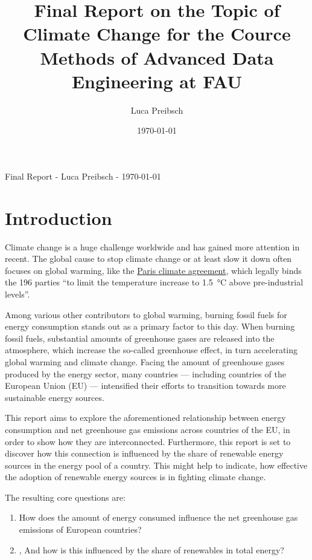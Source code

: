 \documentclass{article}
\begin{document}
\title{Final Report on the Topic of Climate Change
for the Cource Methods of Advanced Data Engineering at FAU}
\author{Luca Preibsch}
\date{\today}

\begin{center}
Final Report - Luca Preibsch - \today
\end{center}


\section*{Introduction}
Climate change is a huge challenge worldwide and has gained more attention in recent.
The global cause to stop climate change or at least slow it down often focuses on global warming, like the
\href{https://unfccc.int/process-and-meetings/the-paris-agreement}{Paris climate agreement},
which legally binds the 196 parties “to limit the temperature increase to 1.5 °C above pre-industrial levels”.

Among various other contributors to global warming, burning fossil fuels for energy consumption stands out as
a primary factor to this day.
When burning fossil fuels, substantial amounts of greenhouse gases are released into the atmosphere,
which increase the so-called greenhouse effect, in turn accelerating global warming and climate change.
Facing the amount of greenhouse gases produced by the energy sector, many countries — including countries of
the European Union (EU) — intensified their efforts to transition towards more sustainable energy sources.

This report aims to explore the aforementioned relationship between energy consumption and net greenhouse gas
emissions across countries of the EU, in order to show how they are interconnected.
Furthermore, this report is set to discover how this connection is influenced by the share of renewable energy sources
in the energy pool of a country. This might help to indicate, how effective the adoption of renewable energy sources is
in fighting climate change.

The resulting core questions are:
\begin{enumerate}
    \item How does the amount of energy consumed influence the net greenhouse gas emissions of European countries?
    \item, And how is this influenced by the share of renewables in total energy?
\end{enumerate}
\end{document}
